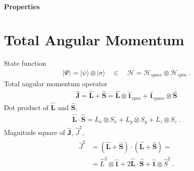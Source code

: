 \documentclass[letterpaper,10pt,english]{jupyterBook}
\begin{document}
\paragraph{Properties}
\label{\detokenize{ch/quantum-mechanics/angular-momentum/angular-momentum-spin:id1}}
\sphinxstepscope


\section{Total Angular Momentum}
\label{\detokenize{ch/quantum-mechanics/angular-momentum/angular-momentum-total:total-angular-momentum}}\label{\detokenize{ch/quantum-mechanics/angular-momentum/angular-momentum-total:quantum-mechanics-angular-momentum-total}}\label{\detokenize{ch/quantum-mechanics/angular-momentum/angular-momentum-total::doc}}
\sphinxAtStartPar
State function
\begin{equation*}
\begin{split}| \Psi \rangle = | \psi \rangle \otimes | \sigma \rangle \quad  \in \quad \mathcal{H} = \mathcal{H}_{space} \otimes \mathcal{H}_{spin} \ .\end{split}
\end{equation*}
\sphinxAtStartPar
Total angular momentum operator
\begin{equation*}
\begin{split}\hat{\mathbf{J}} = \hat{\mathbf{L}} + \hat{\mathbf{S}} = \hat{\mathbf{L}} \otimes \hat{\mathbf{1}}_{spin} + \hat{\mathbf{1}}_{space} \otimes \hat{\mathbf{S}}\end{split}
\end{equation*}
\sphinxAtStartPar
Dot product of \(\hat{\mathbf{L}}\) and \(\hat{\mathbf{S}}\),
\begin{equation*}
\begin{split}\hat{\mathbf{L}} \cdot \hat{\mathbf{S}} = L_x \otimes S_x +  L_y \otimes S_y +  L_z \otimes S_z \ .\end{split}
\end{equation*}
\sphinxAtStartPar
Magnitude square of \(\hat{\mathbf{J}}\), \(\hat{J}^2\),
\begin{equation*}
\begin{split}\begin{aligned}
  \hat{J}^2 
  & = ( \hat{\mathbf{L}} + \hat{\mathbf{S}} ) \cdot ( \hat{\mathbf{L}} + \hat{\mathbf{S}} ) = \\
  & = \hat{L}^2 \otimes \hat{\mathbf{1}} + 2 \hat{\mathbf{L}} \cdot \hat{\mathbf{S}} + \hat{\mathbf{1}} \otimes \hat{S}^2 \ .
\end{aligned}\end{split}
\end{equation*}
\end{document}
